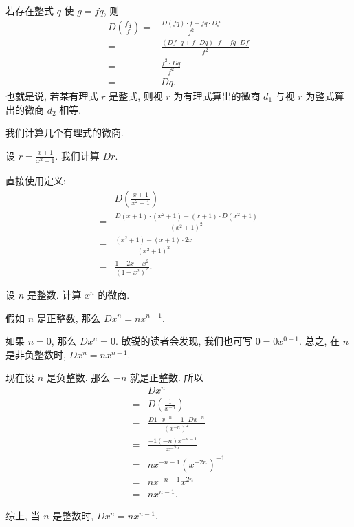 \begin{remark}
    若存在整式 $q$ 使 $g = fq$, 则
    \begin{align*}
        D \left( \frac{fq}{f} \right)
        = {} & \frac{D(fq) \cdot f - fq \cdot Df}{f^2}                     \\
        = {} & \frac{(Df \cdot q + f \cdot Dq) \cdot f - fq \cdot Df}{f^2} \\
        = {} & \frac{f^2 \cdot Dq}{f^2}                                    \\
        = {} & Dq.
    \end{align*}
    也就是说, 若某有理式 $r$ 是整式, 则视 $r$ 为有理式算出的微商 $d_1$ 与视 $r$ 为整式算出的微商 $d_2$ 相等.
\end{remark}

我们计算几个有理式的微商.

\begin{example}
    设 $r = \frac{x + 1}{x^2 + 1}$. 我们计算 $Dr$.

    直接使用定义:
    \begin{align*}
             & D \left( \frac{x + 1}{x^2 + 1} \right)                                  \\
        = {} & \frac{D(x + 1) \cdot (x^2 + 1) - (x + 1) \cdot D(x^2 + 1)}{(x^2 + 1)^2} \\
        = {} & \frac{(x^2 + 1) - (x + 1) \cdot 2x}{(x^2 + 1)^2}                        \\
        = {} & \frac{1 - 2x - x^2}{(1 + x^2)^2}.
    \end{align*}
\end{example}

\begin{example}
    设 $n$ 是整数. 计算 $x^n$ 的微商.

    假如 $n$ 是正整数, 那么 $Dx^n = nx^{n-1}$.

    如果 $n = 0$, 那么 $Dx^n = 0$. 敏锐的读者会发现, 我们也可写 $0 = 0x^{0-1}$. 总之, 在 $n$ 是非负整数时, $Dx^n = nx^{n-1}$.

    现在设 $n$ 是负整数. 那么 $-n$ 就是正整数. 所以
    \begin{align*}
             & Dx^n                                                 \\
        = {} & D \left( \frac{1}{x^{-n}} \right)                    \\
        = {} & \frac{D1 \cdot x^{-n} - 1 \cdot Dx^{-n}}{(x^{-n})^2} \\
        = {} & \frac{-1 (-n) x^{-n-1}}{x^{-2n}}                     \\
        = {} & n x^{-n-1} (x^{-2n})^{-1}                            \\
        = {} & n x^{-n-1} x^{2n}                                    \\
        = {} & n x^{n-1}.
    \end{align*}

    综上, 当 $n$ 是整数时, $Dx^n = nx^{n-1}$.
\end{example}

